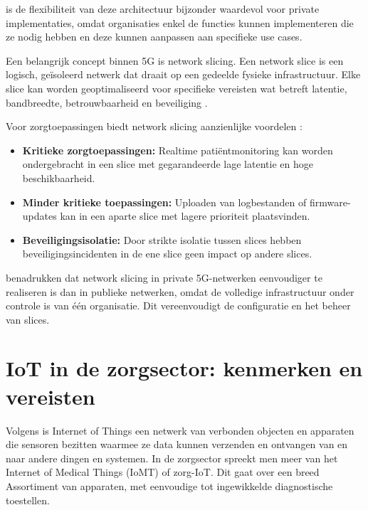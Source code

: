 \textcite{Giordani2020} is de flexibiliteit van deze architectuur bijzonder waardevol voor private implementaties, omdat organisaties enkel de functies kunnen implementeren die ze nodig hebben en deze kunnen aanpassen aan specifieke use cases.
\vspace{0.5cm}

Een belangrijk concept binnen 5G is network slicing. Een network slice is een logisch, geïsoleerd netwerk dat draait op een gedeelde fysieke infrastructuur. Elke slice kan worden geoptimaliseerd voor specifieke vereisten wat betreft latentie, bandbreedte, betrouwbaarheid en beveiliging \autocite{3GPP2024}.

Voor zorgtoepassingen biedt network slicing aanzienlijke voordelen \autocite{Rost2017}:

\begin{itemize}
	\item \textbf{Kritieke zorgtoepassingen:} Realtime patiëntmonitoring kan worden ondergebracht in een slice met gegarandeerde lage latentie en hoge beschikbaarheid.
	\item \textbf{Minder kritieke toepassingen:} Uploaden van logbestanden of firmware-updates kan in een aparte slice met lagere prioriteit plaatsvinden.
	\item \textbf{Beveiligingsisolatie:} Door strikte isolatie tussen slices hebben beveiligingsincidenten in de ene slice geen impact op andere slices.
\end{itemize}
\vspace{0.5cm}

\textcite{Zhang2019} benadrukken dat network slicing in private 5G-netwerken eenvoudiger te realiseren is dan in publieke netwerken, omdat de volledige infrastructuur onder controle is van één organisatie. Dit vereenvoudigt de configuratie en het beheer van slices.
\vspace{0.5cm}

\section{IoT in de zorgsector: kenmerken en vereisten}

Volgens \textcite{SAPnzd} is Internet of Things een netwerk van verbonden objecten en apparaten die sensoren bezitten waarmee ze data kunnen verzenden en ontvangen van en naar andere dingen en systemen.  In de zorgsector spreekt men meer van het Internet of Medical Things (IoMT) of zorg-IoT. Dit gaat over een breed Assortiment van apparaten, met eenvoudige tot ingewikkelde diagnostische toestellen.
\vspace{0.5cm}

